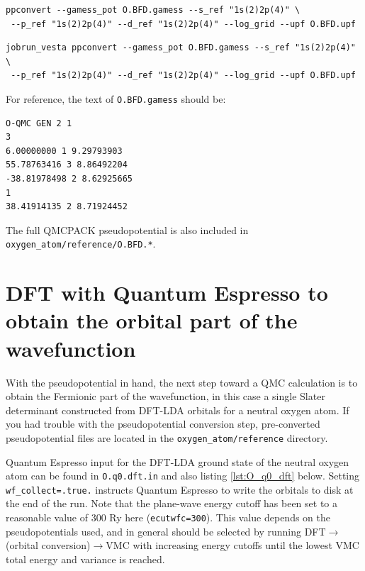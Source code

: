 \noindent
\ifws
\begin{shaded}
\begin{verbatim}
ppconvert --gamess_pot O.BFD.gamess --s_ref "1s(2)2p(4)" \
 --p_ref "1s(2)2p(4)" --d_ref "1s(2)2p(4)" --log_grid --upf O.BFD.upf
\end{verbatim}
\end{shaded}
\else
\begin{shaded}
\begin{verbatim}
jobrun_vesta ppconvert --gamess_pot O.BFD.gamess --s_ref "1s(2)2p(4)" \
 --p_ref "1s(2)2p(4)" --d_ref "1s(2)2p(4)" --log_grid --upf O.BFD.upf
\end{verbatim}
\end{shaded}
\noindent
\fi

For reference, the text of \texttt{O.BFD.gamess} should be:
\begin{lstlisting}
O-QMC GEN 2 1
3
6.00000000 1 9.29793903
55.78763416 3 8.86492204
-38.81978498 2 8.62925665
1
38.41914135 2 8.71924452

\end{lstlisting}
\noindent
The full QMCPACK pseudopotential is also included in \texttt{oxygen\_atom/reference/O.BFD.*}.


\section{DFT with Quantum Espresso to obtain the orbital part of the wavefunction}
\label{sec:lqb_dft}
With the pseudopotential in hand, the next step toward a QMC calculation is to obtain the Fermionic part of the wavefunction, in this case a single Slater determinant constructed from DFT-LDA orbitals for a neutral oxygen atom.  If you had trouble with the pseudopotential conversion step, pre-converted pseudopotential files are located in the \texttt{oxygen\_atom/reference} directory.  

Quantum Espresso input for the DFT-LDA ground state of the neutral oxygen atom can be found in \texttt{O.q0.dft.in} and also listing \ref{lst:O_q0_dft} below.  Setting \texttt{wf\_collect=.true.} instructs Quantum Espresso to write the orbitals to disk at the end of the run.  Note that the plane-wave energy cutoff has been set to a reasonable value of 300 Ry here (\texttt{ecutwfc=300}).  This value depends on the pseudopotentials used, and in general should be selected by running DFT$\rightarrow$(orbital conversion)$\rightarrow$VMC with increasing energy cutoffs until the lowest VMC total energy and variance is reached.

